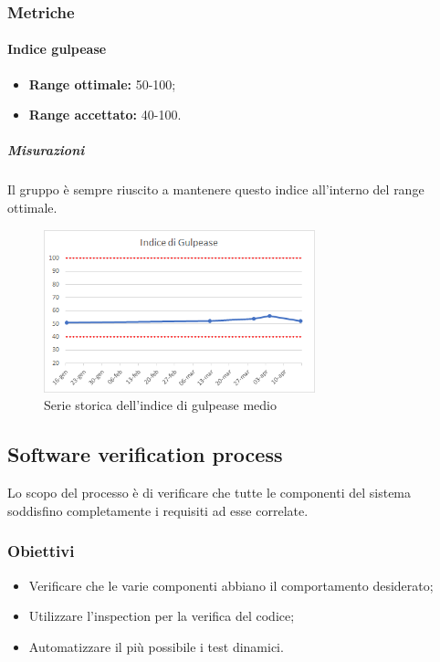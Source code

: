 		\subsubsection{Metriche}
			\paragraph{Indice gulpease} \Spazio
			\begin{itemize}
				\item \textbf{Range ottimale:} 50-100;
				\item \textbf{Range accettato:} 40-100.
			\end{itemize}
            \subparagraph{Misurazioni}
            Il gruppo è sempre riuscito a mantenere questo indice all'interno del range ottimale.
            \begin{figure}[H]
            	\centering 
            	\includegraphics[width=0.7\textwidth]{Images/Gulpease.png}
            	\caption{Serie storica dell'indice di gulpease medio}
            	\label{gul} 
            \end{figure}
            
	\subsection{Software verification process}
	Lo scopo del processo è di verificare che tutte le componenti del sistema soddisfino completamente i requisiti ad esse correlate.
		\subsubsection{Obiettivi}
		\begin{itemize}
			\item Verificare che le varie componenti abbiano il comportamento desiderato;
			\item Utilizzare l'inspection per la verifica del codice;
			\item Automatizzare il più possibile i test dinamici.
		\end{itemize}

